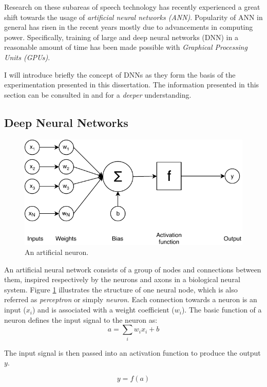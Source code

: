 Research on these subareas of speech technology has recently experienced a great shift towards the usage of \textit{artificial neural networks (ANN)}. Popularity of ANN in general has risen in the recent years mostly due to advancements in computing power. Specifically, training of large and deep neural networks (DNN) in a reasonable amount of time has been made possible with \textit{Graphical Processing Units (GPUs)}.

I will introduce briefly the concept of DNNs as they form the basis of the experimentation presented in this dissertation. The information presented in this section can be consulted in \cite{shigeru2000handbook} and \cite{bengio_dl} for a \textit{deeper} understanding. 

\subsection{Deep Neural Networks}
\label{sota:dnns}

\begin{figure}[t]
  \centering
  \includegraphics[width=0.6\linewidth]{img/perceptron.pdf}
  \caption{An artificial neuron.}
  \label{sota:neuron}
\end{figure}

An artificial neural network consists of a group of nodes and connections between them, inspired respectively by the neurons and axons in a biological neural system. Figure \ref{sota:neuron} illustrates the structure of one neural node, which is also referred as \textit{perceptron} or simply \textit{neuron}. Each connection towards a neuron is an input ($x_i$) and is associated with a weight coefficient ($w_i$). The basic function of a neuron defines the input signal to the neuron as:
\begin{equation}
    a = \sum _{ i }{ w_i x_i + b} 
\end{equation}

The input signal is then passed into an activation function to produce the output $y$. 

\begin{equation}
    y = f(a)
\end{equation}

